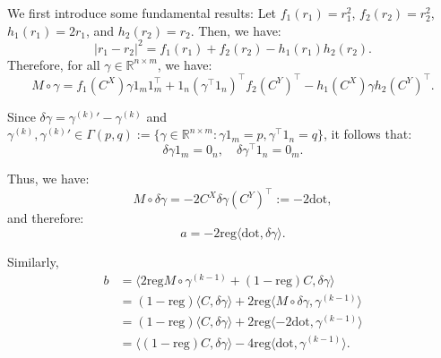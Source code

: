 \documentclass[12pt]{article}
\begin{document}
We first introduce some fundamental results:  
Let $f_1(r_1) = r_1^2$, $f_2(r_2) = r_2^2$, $h_1(r_1) = 2r_1$, and $h_2(r_2) = r_2$. Then, we have:  
$$
|r_1 - r_2|^2 = f_1(r_1) + f_2(r_2) - h_1(r_1)h_2(r_2).
$$
Therefore, for all $\gamma \in \mathbb{R}^{n \times m}$, we have:  
$$
M \circ \gamma = f_1(C^X)\gamma 1_m 1_m^\top + 1_n (\gamma^\top 1_n)^\top f_2(C^Y)^\top - h_1(C^X)\gamma h_2(C^Y)^\top.
$$

Since $\delta \gamma = \gamma^{(k)}{'} - \gamma^{(k)}$ and $\gamma^{(k)}, \gamma^{(k)}{'} \in \Gamma(p, q) := \{\gamma \in \mathbb{R}^{n \times m} : \gamma 1_m = p, \gamma^\top 1_n = q\}$, it follows that:  
$$
\delta \gamma 1_m = 0_n, \quad \delta \gamma^\top 1_n = 0_m.
$$

Thus, we have:  
$$
M \circ \delta \gamma = -2 C^X \delta \gamma (C^Y)^\top := -2\text{dot},
$$
and therefore:  
$$
a = -2\text{reg}\langle\text{dot},\delta\gamma \rangle. \label{eq:a}
$$

Similarly,  
\begin{align}
b &= \langle 2\text{reg} M \circ \gamma^{(k-1)} + (1-\text{reg}) C, \delta \gamma \rangle \nonumber \\
  &= (1-\text{reg}) \langle C, \delta \gamma \rangle + 2\text{reg} \langle M \circ \delta \gamma, \gamma^{(k-1)} \rangle \nonumber \\
  &= (1-\text{reg}) \langle C, \delta \gamma \rangle + 2\text{reg} \langle -2\text{dot}, \gamma^{(k-1)} \rangle \nonumber \\
  &= \langle (1-\text{reg}) C, \delta \gamma \rangle - 4\text{reg} \langle \text{dot}, \gamma^{(k-1)} \rangle. \nonumber
\end{align}
\end{document}
